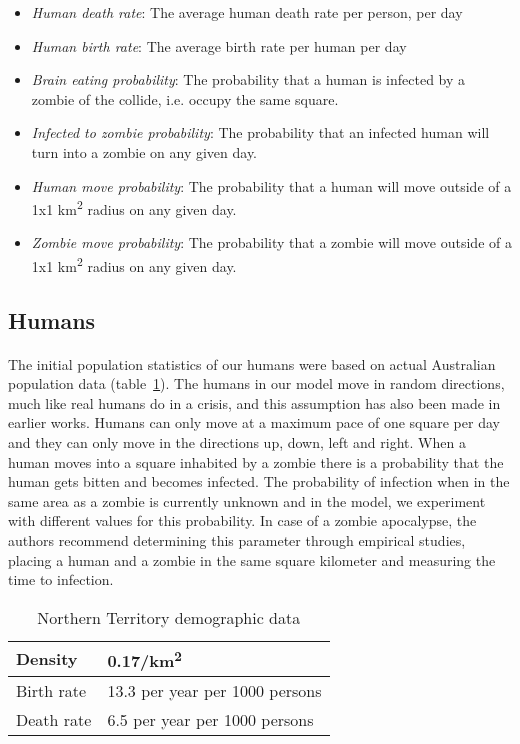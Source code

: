 \documentclass{article}
\begin{document}
\begin{itemize}
\item \emph{Human death rate}: The average human death rate per person, per day
\item \emph{Human birth rate}: The average birth rate per human per day
\item \emph{Brain eating probability}: The probability that a human is infected by a zombie of the collide, i.e. occupy the same square.
\item \emph{Infected to zombie probability}: The probability that an infected human will turn into a zombie on any given day.
\item \emph{Human move probability}: The probability that a human will move outside of a 1x1 km\textsuperscript{2} radius on any given day.
\item \emph{Zombie move probability}: The probability that a zombie will move outside of a 1x1 km\textsuperscript{2} radius on any given day.
\end{itemize}

\subsection{Humans}
\paragraph{}
The initial population statistics of our humans were based on actual Australian population data (table~\ref{AustralianData}). The humans in our model move in random directions, much like real humans do in a crisis, and this assumption has also been made in earlier works\cite{munz}. Humans can only move at a maximum pace of one square per day and they can only move in the directions up, down, left and right. When a human moves into a square inhabited by a zombie there is a probability that the human gets bitten and becomes infected. The probability of infection when in the same area as a zombie is currently unknown and in the model, we experiment with different values for this probability. In case of a zombie apocalypse, the authors recommend determining this parameter through empirical studies, placing a human and a zombie in the same square kilometer and measuring the time to infection.
\begin{table}[!h]
\centering
    \begin{tabular}{|l|l|}
      \hline
        Density    & 0.17/km\textsuperscript{2} \\
      \hline
        Birth rate & 13.3 per year per 1000 persons \\
      \hline
        Death rate & 6.5 per year per 1000 persons \\
      \hline
\end{tabular}
\caption{Northern Territory demographic data}\label{AustralianData}
\end{table}
\end{document}
